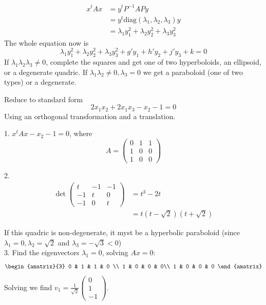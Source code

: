 \documentclass[10pt]{scrartcl}
\begin{document}
\begin{align*}
  x^tAx &= y^tP^{-1}APy \\
  &= y^t\mathrm{diag}(\lambda_1,\lambda_2,\lambda_3)y\\
  &= \lambda_1y_1^2 + \lambda_2y_2^2 + \lambda_3y_3^2
\end{align*}
The whole equation now is 
\[
  \lambda_1y_1^2 + \lambda_2y_2^2 + \lambda_3y_3^2
+ g'y_1 + h'y_2 + j'y_3 + k = 0
\]
If $\lambda_1\lambda_2\lambda_3 \neq 0$, complete the squares and get one of two hyperboloids, an ellipsoid, or a degenerate quadric. If $\lambda_1\lambda_2 \neq 0, \lambda_3 = 0$ we get a paraboloid (one of two types) or a degenerate.\\

\begin{example} Reduce to standard form
\[
  2x_1x_2 + 2x_1x_3 - x_2 - 1 = 0
\]
Using an orthogonal transformation and a translation.	

1. $x^tAx - x_2 - 1= 0$, where
\[
  A = \begin{pmatrix}
 0 & 1 & 1 \\ 1 & 0 & 0 \\ 1 & 0 & 0 	
 \end{pmatrix}
\]

2. 
\begin{align*}
  \det\begin{pmatrix}
t & -1 & - 1\\ -1 & t & 0 \\ -1 & 0 & t	
\end{pmatrix} &= t^3  -2t\\
&= t(t-\sqrt{2})(t+\sqrt{2})
\end{align*}

If this quadric is non-degenerate, it myst be a hyperbolic paraboloid (since $\lambda_1 = 0, \lambda_2 = \sqrt{2}$ and $\lambda_3 = -\sqrt{3} < 0$)\\

3. Find the eigenvectors $\lambda_1 = 0$, solving $Ax = 0$: 
\[
  \begin{amatrix}{3}
  	0 & 1 & 1 & 0 \\ 
  	1 & 0 & 0 & 0\\
  	1 & 0 & 0 & 0 
  \end{amatrix}
\]
Solving we find $v_1 = \frac{1}{\sqrt{2}}\begin{pmatrix}
0 \\ 1 \\-1	
\end{pmatrix}$. 


\end{example}
\end{document}
